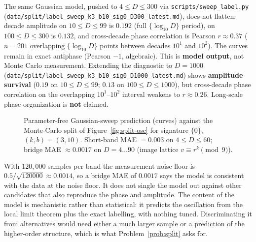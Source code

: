 \documentclass[11pt]{article}
\theoremstyle{definition}
\theoremstyle{remark}
\begin{document}
The same Gaussian model, pushed to $4 \le D \le 300$ via \texttt{scripts/sweep\_label.py} (\texttt{data/split/label\_sweep\_k3\_b10\_sig0\_D300\_latest.md}), does not flatten: decade amplitude on $10 \le D \le 99$ is $0.192$ (full $\{\log_{10} D\}$ period), on $100 \le D \le 300$ is $0.132$, and cross-decade phase correlation is Pearson $r \approx 0.37$ ($n=201$ overlapping $\{\log_{10} D\}$ points between decades $10^1$ and $10^2$). The curves remain in exact antiphase (Pearson $-1$, algebraic). This is \textbf{model output}, not Monte Carlo measurement. Extending the diagnostic to $D=1000$ (\texttt{data/split/label\_sweep\_k3\_b10\_sig0\_D1000\_latest.md}) shows \textbf{amplitude survival} ($0.19$ on $10 \le D \le 99$; $0.13$ on $100 \le D \le 1000$), but cross-decade phase correlation on the overlapping $10^1$--$10^2$ interval weakens to $r \approx 0.26$. Long-scale phase organization is \textbf{not} claimed.

\begin{figure}[htbp]
\centering

\caption{Parameter-free Gaussian-sweep prediction (curves) against the Monte-Carlo split of Figure~\ref{fig:split-osc} for signature $\{0\}$, $(k,b)=(3,10)$. Short-band MAE $= 0.003$ on $4 \le D \le 60$; bridge MAE $\approx 0.0017$ on $D=4\ldots 90$ (image lattice $v \equiv r^k \pmod 9$).}
\label{fig:split-predict}
\end{figure}

With $120{,}000$ samples per band the measurement noise floor is $0.5/\sqrt{120000} \approx 0.0014$, so a bridge MAE of $0.0017$ says the model is consistent with the data at the noise floor. It does not single the model out against other candidates that also reproduce the phase and amplitude. The content of the model is mechanistic rather than statistical: it predicts the oscillation from the local limit theorem plus the exact labelling, with nothing tuned. Discriminating it from alternatives would need either a much larger sample or a prediction of the higher-order structure, which is what Problem~\ref{prob:split} asks for.
\end{document}
